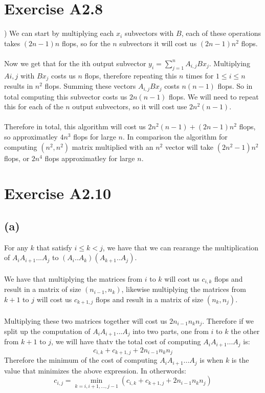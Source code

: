 \section*{Exercise A2.8})
We can start by multiplying each $x_i$ subvectors with $B$, each of these operations takes $(2n-1)n$ flops, so for the $n$ subvectors it will cost us $(2n-1)n^2$ flops.
\\\\Now we get that for the ith output subvector $y_i=\sum_{j=1}^{n}A_{i,j}Bx_j$. Multiplying $A{i,j}$ with $Bx_j$ costs us $n$ flops, therefore repeating this $n$ times for 
$1\leq i \leq n$ results in $n^2$ flops. Summing these vectors $A_{i,j}Bx_j$ costs $n(n-1)$ flops. So in total computing this subvector costs us $2n(n-1)$ flops. We will need to repeat this for each of the $n$ output subvectors, so it will cost use $2n^2(n-1)$.\\\\
Therefore in total, this algorithm will cost us $2n^2(n-1)+(2n-1)n^2$ flops, so approximatley $4n^3$ flops for large $n$. In comparison the algorithm for computing $(n^2,n^2)$ matrix multiplied with an $n^2$ vector will take $(2n^2-1)n^2$ flops, or $2n^4$ flops approximatley for large $n$.
\section*{Exercise A2.10}
\subsection*{(a)}
For any $k$ that satisfy $i\leq k < j$, we have that we can rearange the multiplication of $A_iA_{i+1}...A_{j}$ to $(A_i..A_k)(A_{k+1}..A_j)$.\\\\
We have that multiplying the matrices from $i$ to $k$ will cost us $c_{i,k}$ flops and result in a
matrix of size $(n_{i-1},n_k)$, likewise multiplying the matrices from $k+1$ to $j$ will cost us $c_{k+1,j}$ flops and result in a matrix of size $(n_{k},n_j)$.\\\\
Multiplying these two matrices together will cost us $2n_{i-1}n_kn_j$. Therefore if we split up the computation of 
$A_iA_{i+1}...A_{j}$ into two parts, one from $i$ to $k$ the other from $k+1$ to $j$, we will have thatv the total cost of computing $A_iA_{i+1}...A_{j}$ is:
$$c_{i,k}+c_{k+1,j}+2n_{i-1}n_kn_j$$
Therefore the minimum of the cost of computing $A_iA_{i+1}...A_{j}$ is when $k$ is the value that minimizes the above expression. In otherwords:
$$c_{i,j}=\min_{k=i,i+1,...,j-1}(c_{i,k}+c_{k+1,j}+2n_{i-1}n_kn_j)$$
